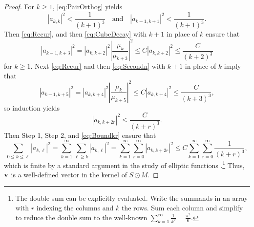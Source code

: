 \documentclass[10pt,reqno]{amsart}
\newcommand{\0}{{\color{lightgray}0}}
\renewcommand{\leq}{\leqslant}
\renewcommand{\geq}{\geqslant}
\renewcommand{\vec}[1]{{\bf #1}}
\theoremstyle{definition}
\numberwithin{equation}{section}
\begin{document}
\begin{proof}
For $k \geq 1$, \eqref{eq:PairOrthog} yields
\begin{equation}\label{eq:CubeDecay}
    |a_{k,k}|^2 < \frac{1}{(k+1)^3} \quad \text{and} \quad |a_{k-1,k+1}|^2 < \frac{1}{(k+1)^3}.
\end{equation}
Then \eqref{eq:Recur}, and then \eqref{eq:CubeDecay} with $k+1$ in place of $k$
ensure that 
\begin{equation}\label{eq:Secondn}
    |a_{k-1,k+3}|^2 
    = |a_{k, k+2}|^2 \left| \frac{\mu_{k}}{\mu_{k+3}} \right|^2 
    \leq C|a_{k, k+2}|^2
    \leq \frac{C}{(k+2)^3}
\end{equation}
for $k \geq 1$.
Next \eqref{eq:Recur} and then \eqref{eq:Secondn} with $k+1$ in place of $k$ imply that
\begin{equation*}
|a_{k-1,k+5}|^2 
= |a_{k, k+4}|^2 \left| \frac{\mu_{k}}{\mu_{k+5}} \right|^2 
\leq C|a_{k, k+4}|^2 
\leq \frac{C}{(k+3)^3},
\end{equation*}
so induction yields
\begin{equation}\label{eq:Boundkr}
| a_{k,k+2r} |^2 \leq \frac{C}{(k + r)^3}.
\end{equation}
Then Step 1, Step 2, and \eqref{eq:Boundkr} ensure that
\begin{equation*}
\sum_{0\leq k \leq \ell} |a_{k,\ell}|^2
= \sum_{k=1}^{\infty} \sum_{\ell \geq k} |a_{k,\ell}|^2 
= \sum_{k=1}^{\infty} \sum_{r=0}^{\infty} |a_{k,k+2r}|^2 
\leq C \sum_{k=1}^{\infty} \sum_{r=0}^{\infty} \frac{1}{(k + r)^3} ,
\end{equation*}
which is finite by a standard argument in the study of elliptic functions \cite[Prop.~10.4.2]{SimonComplex}.\footnote{The double sum can be explicitly evaluated. Write the summands in an array with $r$ indexing the columns and $k$ the rows.  Sum
each column and simplify to reduce the double sum to the well-known $\sum_{k=1}^{\infty} \frac{1}{k^2} = \frac{\pi^2}{6}$.}
Thus, $\vec{v}$ is a well-defined vector in the kernel of $S \odot M$.



\end{proof}
\end{document}
